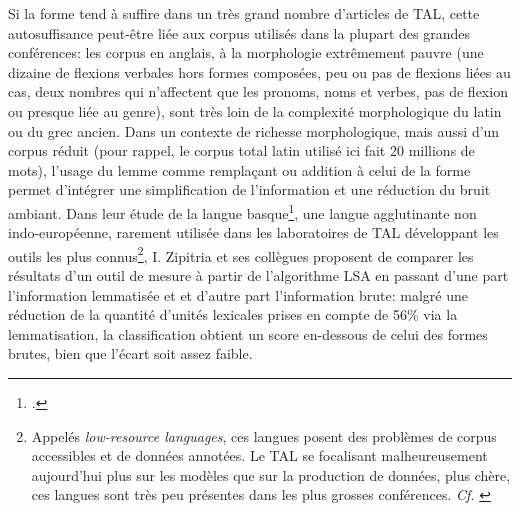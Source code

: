 Si la forme tend à suffire dans un très grand nombre d'articles de TAL, cette autosuffisance peut-être liée aux corpus utilisés dans la plupart des grandes conférences: les corpus en anglais, à la morphologie extrêmement pauvre (une dizaine de flexions verbales hors formes composées, peu ou pas de flexions liées au cas, deux nombres qui n'affectent que les pronoms, noms et verbes, pas de flexion ou presque liée au genre), sont très loin de la complexité morphologique du latin ou du grec ancien. Dans un contexte de richesse morphologique, mais aussi d'un corpus réduit (pour rappel, le corpus total latin utilisé ici fait 20 millions de mots), l'usage du lemme comme remplaçant ou addition à celui de la forme permet d'intégrer une simplification de l'information et une réduction du bruit ambiant. Dans leur étude de la langue basque\footcite{zipitria_observing_2006}, une langue agglutinante non indo-européenne, rarement utilisée dans les laboratoires de TAL développant les outils les plus connus\footnote{Appelés \textit{low-resource languages}, ces langues posent des problèmes de corpus accessibles et de données annotées. Le TAL se focalisant malheureusement aujourd'hui plus sur les modèles que sur la production de données, plus chère, ces langues sont très peu présentes dans les plus grosses conférences. \textit{Cf.} \cite{magueresse_low-resource_2020}}, I. Zipitria et ses collègues proposent de comparer les résultats d'un outil de mesure à partir de l'algorithme LSA en passant d'une part l'information lemmatisée et et d'autre part l'information brute: malgré une réduction de la quantité d'unités lexicales prises en compte de 56\% via la lemmatisation, la classification obtient un score en-dessous de celui des formes brutes, bien que l'écart soit assez faible. 

